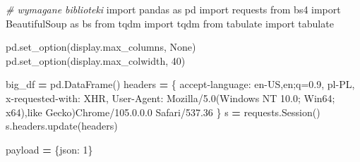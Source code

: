 \documentclass[
  12pt,
]{article}
\newenvironment{Shaded}{\begin{snugshade}}{\end{snugshade}}
\newcommand{\CommentTok}[1]{\textcolor[rgb]{0.56,0.35,0.01}{\textit{#1}}}
\newcommand{\DecValTok}[1]{\textcolor[rgb]{0.00,0.00,0.81}{#1}}
\newcommand{\ImportTok}[1]{#1}
\newcommand{\NormalTok}[1]{#1}
\newcommand{\OperatorTok}[1]{\textcolor[rgb]{0.81,0.36,0.00}{\textbf{#1}}}
\newcommand{\StringTok}[1]{\textcolor[rgb]{0.31,0.60,0.02}{#1}}
\newcommand{\VariableTok}[1]{\textcolor[rgb]{0.00,0.00,0.00}{#1}}
\begin{document}
\begin{Shaded}
\begin{Highlighting}[]
\CommentTok{\# wymagane biblioteki}
\ImportTok{import}\NormalTok{ pandas }\ImportTok{as}\NormalTok{ pd}
\ImportTok{import}\NormalTok{ requests}
\ImportTok{from}\NormalTok{ bs4 }\ImportTok{import}\NormalTok{ BeautifulSoup }\ImportTok{as}\NormalTok{ bs}
\ImportTok{from}\NormalTok{ tqdm }\ImportTok{import}\NormalTok{ tqdm}
\ImportTok{from}\NormalTok{ tabulate }\ImportTok{import}\NormalTok{ tabulate}

\NormalTok{pd.set\_option(}\StringTok{\textquotesingle{}display.max\_columns\textquotesingle{}}\NormalTok{, }\VariableTok{None}\NormalTok{)}
\NormalTok{pd.set\_option(}\StringTok{\textquotesingle{}display.max\_colwidth\textquotesingle{}}\NormalTok{, }\DecValTok{40}\NormalTok{)}

\NormalTok{big\_df }\OperatorTok{=}\NormalTok{ pd.DataFrame()}
\NormalTok{headers }\OperatorTok{=}\NormalTok{ \{}
\StringTok{\textquotesingle{}accept{-}language\textquotesingle{}}\NormalTok{: }\StringTok{\textquotesingle{}en{-}US,en;q=0.9, pl{-}PL\textquotesingle{}}\NormalTok{,}
\StringTok{\textquotesingle{}x{-}requested{-}with\textquotesingle{}}\NormalTok{: }\StringTok{\textquotesingle{}XHR\textquotesingle{}}\NormalTok{,}
\StringTok{\textquotesingle{}User{-}Agent\textquotesingle{}}\NormalTok{:}
\StringTok{\textquotesingle{}Mozilla/5.0(Windows NT 10.0; Win64; x64),like Gecko)Chrome/105.0.0.0 Safari/537.36\textquotesingle{}}
\NormalTok{\}}
\NormalTok{s }\OperatorTok{=}\NormalTok{ requests.Session()}
\NormalTok{s.headers.update(headers)}

\NormalTok{payload }\OperatorTok{=}\NormalTok{ \{}\StringTok{\textquotesingle{}json\textquotesingle{}}\NormalTok{: }\StringTok{\textquotesingle{}1\textquotesingle{}}\NormalTok{\}}


\end{Highlighting}
\end{Shaded}
\end{document}
